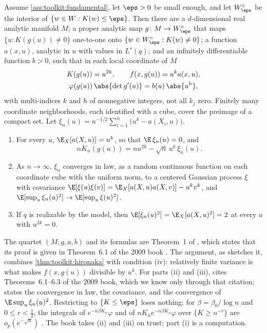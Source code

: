 \begin{refsection}
\begin{theorem}\label{thm:toolkit:empirical}
Assume \cref{ass:toolkit:fundamental}, let $\eps>0$ be small enough, and let $W_\eps^\circ$ be the interior of $\{w\in W:K(w)\le\eps\}$. Then there are a $d$-dimensional real analytic manifold $M$; a proper analytic map $g\colon M\to W_\eps^\circ$ that maps $\{u:K(g(u))\ne0\}$ one-to-one onto $\{w\in W_\eps^\circ:K(w)\ne0\}$; a function $a(x,u)$, analytic in $u$ with values in $L^s(q)$; and an infinitely differentiable function $b>0$, such that in each local coordinate of $M$
\begin{gather*}
K(g(u))=u^{2k},\qquad f(x,g(u))=u^ka(x,u),\\
\varphi(g(u))\,\abs{\det g'(u)}=b(u)\,\abs{u^h},
\end{gather*}
with multi-indices $k$ and $h$ of nonnegative integers, not all $k_j$ zero. Finitely many coordinate neighborhoods, each identified with a cube, cover the preimage of a compact set. Let $\xi_n(u)=n^{-1/2}\sum_{i=1}^n\bigl(u^k-a(X_i,u)\bigr)$.
\begin{enumerate}
\item For every $u$, $\E_X[a(X,u)]=u^k$, so that $\E\,\xi_n(u)=0$, and
\begin{equation}\label{eq:toolkit:standardform}
nK_n(g(u))=nu^{2k}-\sqrt n\,u^k\,\xi_n(u).
\end{equation}
\item As $n\to\infty$, $\xi_n$ converges in law, as a random continuous function on each coordinate cube with the uniform norm, to a centered Gaussian process $\xi$ with covariance $\E[\xi(u)\xi(v)]=\E_X[a(X,u)a(X,v)]-u^kv^k$, and $\E[\sup_u\xi_n(u)^2]\to\E[\sup_u\xi(u)^2]$.
\item If $q$ is realizable by the model, then $\E[\xi_n(u)^2]=\E_X[a(X,u)^2]=2$ at every $u$ with $u^{2k}=0$.
\end{enumerate}
\end{theorem}

The quartet $(M,g,a,b)$ and its formulas are Theorem~1 of \textcite{Watanabe2013}, which states that its proof is given in Theorem~6.1 of the 2009 book \parencite{Watanabe2009}. The argument, as \textcite[Section~4.2]{Watanabe2024} sketches it, combines \cref{thm:toolkit:hironaka} with condition (iv): relatively finite variance is what makes $f(x,g(u))$ divisible by $u^k$. For parts (ii) and (iii), \textcite[p.~881]{Watanabe2013} cites Theorems~6.1--6.3 of the 2009 book, which we know only through that citation; \textcite[Section~4.2, eqs.~(42)--(43)]{Watanabe2024} states the convergence in law, the covariance, and the convergence of $\E\sup_u\xi_n(u)^2$. Restricting to $\{K\le\eps\}$ loses nothing: for $\beta=\beta_0/\log n$ and $0\le r<\frac12$, the integrals of $e^{-n\beta K_n}\varphi$ and of $nK_ne^{-n\beta K_n}\varphi$ over $\{K\ge n^{-r}\}$ are $o_p(e^{-\sqrt n})$ \parencite[Lemma~1]{Watanabe2013}. The book takes (ii) and (iii) on trust; part (i) is a computation.


\end{refsection}
